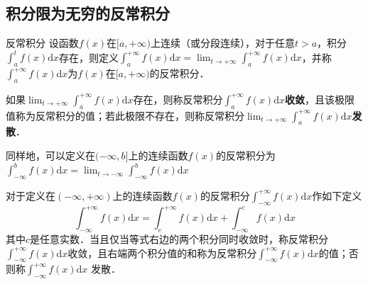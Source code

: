 \begin{issues}
\issueTODO
\issueDraft
\end{issues}

\subsection{积分限为无穷的反常积分}
\begin{definition}{反常积分}
设函数$f(x)$在$[a, +\infty)$上连续（或分段连续），对于任意$t>a$，积分$\displaystyle \int^t_af(x)\mathrm{d} x$存在，则定义$\displaystyle \int ^{+\infty}_a f(x)\mathrm{d} x=\lim_{t\rightarrow+\infty }\int _a^{+\infty}f(x)\mathrm{d} x$，并称$\displaystyle \int ^{+\infty}_a f(x)\mathrm{d} x $为$f(x)$在$[a, +\infty)$的反常积分．

如果$\displaystyle \lim_{t\rightarrow+\infty }\int _a^{+\infty}f(x)\mathrm{d} x$存在，则称反常积分$\displaystyle \int ^{+\infty}_a f(x)\mathrm{d} x$\textbf{收敛}，且该极限值称为反常积分的值；若此极限不存在，则称反常积分$\displaystyle \lim_{t\rightarrow+\infty }\int _a^{+\infty}f(x)\mathrm{d} x$\textbf{发散}．
\end{definition}

同样地，可以定义在$(-\infty,b]$上的连续函数$f(x)$的反常积分为$\displaystyle \int ^b _{-\infty}f(x)\mathrm{d} x=\lim_{t\rightarrow-\infty }\int ^b _{-\infty}f(x)\mathrm{d} x$

对于定义在$(-\infty,+\infty )$上的连续函数$f(x)$的反常积分$\displaystyle \int ^{+\infty}_{-\infty}f(x)\mathrm{d} x$作如下定义
$$\displaystyle \int ^{+\infty}_{-\infty}f(x)\mathrm{d} x=\displaystyle \int ^{+\infty}_c f(x)\mathrm{d} x+\displaystyle \int ^c _{-\infty}f(x)\mathrm{d} x$$
其中$c$是任意实数．当且仅当等式右边的两个积分同时收敛时，称反常积分$\displaystyle \int ^{+\infty}_{-\infty}f(x)\mathrm{d} x$收敛，且右端两个积分值的和称为反常积分$\displaystyle \int ^{+\infty}_{-\infty}f(x)\mathrm{d} x$的值；否则称$\displaystyle \int ^{+\infty}_{-\infty}f(x)\mathrm{d} x$ 发散．
